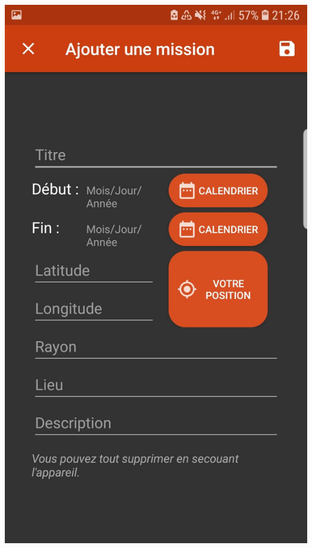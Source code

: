 \documentclass{article}
\begin{document}
\begin{center}
    \includegraphics[scale=0.1]{ajoutM.jpg}

\end{center}
\end{document}
